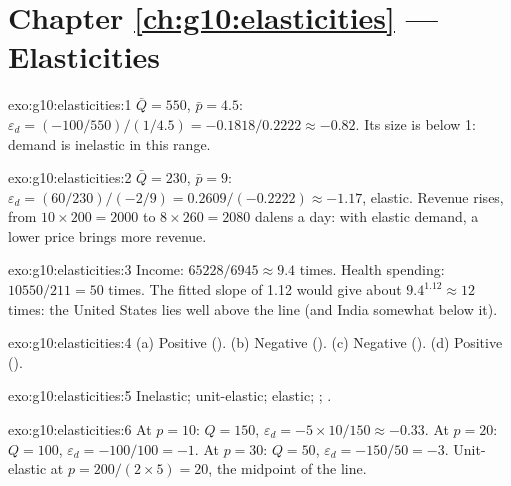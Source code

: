 \section*{Chapter \ref{ch:g10:elasticities} --- Elasticities}

\begin{solution}{exo:g10:elasticities:1}
$\bar Q = 550$, $\bar p = 4.5$: $\varepsilon_d = (-100/550)/(1/4.5) = -0.1818/0.2222 \approx -0.82$. Its size is below 1: demand is inelastic in this
range.
\end{solution}

\begin{solution}{exo:g10:elasticities:2}
$\bar Q = 230$, $\bar p = 9$: $\varepsilon_d = (60/230)/(-2/9) = 0.2609/(-0.2222) \approx -1.17$, elastic. Revenue rises, from $10 \times 200 = 2000$ to $8
\times 260 = 2080$ dalens a day: with elastic demand, a lower price brings more revenue.
\end{solution}

\begin{solution}{exo:g10:elasticities:3}
Income: $65228/6945 \approx 9.4$ times. Health spending: $10550/211 = 50$ times. The fitted slope of 1.12 would give about $9.4^{1.12} \approx 12$ times: the
United States lies well above the line (and India somewhat below it).
\end{solution}

\begin{solution}{exo:g10:elasticities:4}
(a) Positive (). (b) Negative (). (c) Negative (). (d) Positive ().
\end{solution}

\begin{solution}{exo:g10:elasticities:5}
Inelastic; unit-elastic; elastic; ; .
\end{solution}

\begin{solution}{exo:g10:elasticities:6}
At $p = 10$: $Q = 150$, $\varepsilon_d = -5 \times 10/150 \approx -0.33$. At $p = 20$: $Q = 100$, $\varepsilon_d = -100/100 = -1$. At $p = 30$: $Q = 50$,
$\varepsilon_d = -150/50 = -3$. Unit-elastic at $p = 200/(2 \times 5) = 20$, the midpoint of the line.
\end{solution}

